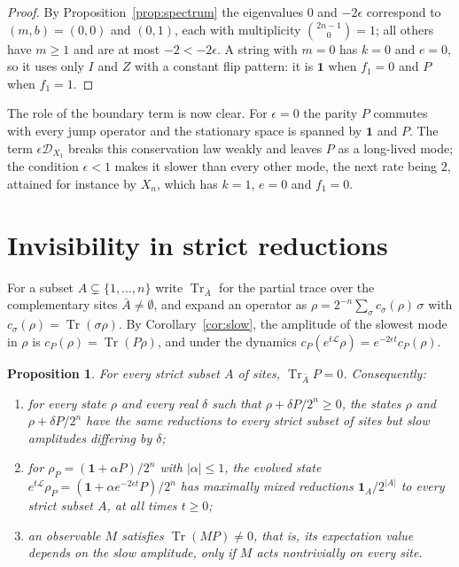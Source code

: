 \documentclass[11pt,a4paper]{article}
\newtheorem{proposition}[theorem]{Proposition}
\theoremstyle{definition}
\theoremstyle{plain}
\DeclareMathOperator{\Tr}{Tr}
\newcommand{\one}{\mathbf{1}}
\newcommand{\cL}{\mathcal{L}}
\newcommand{\cD}{\mathcal{D}}
\begin{document}
\begin{proof}
By Proposition~\ref{prop:spectrum} the eigenvalues $0$ and $-2\epsilon$
correspond to $(m,b)=(0,0)$ and $(0,1)$, each with multiplicity
$\binom{2n-1}{0}=1$; all others have $m\ge1$ and are at most $-2<-2\epsilon$.
A string with $m=0$ has $k=0$ and $e=0$, so it uses only $I$ and $Z$ with a
constant flip pattern: it is $\one$ when $f_1=0$ and $P$ when $f_1=1$.
\end{proof}

The role of the boundary term is now clear. For $\epsilon=0$ the parity $P$
commutes with every jump operator and the stationary space is spanned by
$\one$ and $P$. The term $\epsilon\cD_{X_1}$ breaks this conservation law
weakly and leaves $P$ as a long-lived mode; the condition $\epsilon<1$ makes
it slower than every other mode, the next rate being $2$, attained for
instance by $X_n$, which has $k=1$, $e=0$ and $f_1=0$.

\section{Invisibility in strict reductions}\label{sec:invisible}
For a subset $A\subsetneq\{1,\dots,n\}$ write $\Tr_{\bar A}$ for the partial
trace over the complementary sites $\bar A\ne\emptyset$, and expand an
operator as $\rho=2^{-n}\sum_\sigma c_\sigma(\rho)\,\sigma$ with
$c_\sigma(\rho)=\Tr(\sigma\rho)$. By Corollary~\ref{cor:slow}, the amplitude
of the slowest mode in $\rho$ is $c_P(\rho)=\Tr(P\rho)$, and under the
dynamics $c_P(e^{t\cL}\rho)=e^{-2\epsilon t}c_P(\rho)$.

\begin{proposition}\label{prop:invisible}
For every strict subset $A$ of sites, $\Tr_{\bar A}P=0$. Consequently:
\begin{enumerate}
\item for every state $\rho$ and every real $\delta$ such that
$\rho+\delta P/2^n\ge0$, the states $\rho$ and $\rho+\delta P/2^n$ have the
same reductions to every strict subset of sites but slow amplitudes
differing by $\delta$;
\item for $\rho_P=(\one+\alpha P)/2^n$ with $|\alpha|\le1$, the evolved
state $e^{t\cL}\rho_P=(\one+\alpha e^{-2\epsilon t}P)/2^n$ has maximally
mixed reductions $\one_A/2^{|A|}$ to every strict subset $A$, at all times
$t\ge0$;
\item an observable $M$ satisfies $\Tr(MP)\ne0$, that is, its expectation
value depends on the slow amplitude, only if $M$ acts nontrivially on every
site.
\end{enumerate}
\end{proposition}
\end{document}
